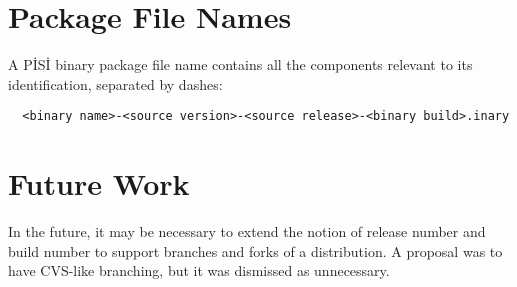 \documentclass[a4paper,11pt]{article}
\begin{document}
\section{Package File Names}

A P\.IS\.I binary package file name contains all the components relevant
to its identification, separated by dashes:
\begin{verbatim}
  <binary name>-<source version>-<source release>-<binary build>.inary
\end{verbatim}

\section{Future Work}

In the future, it may be necessary to extend the notion of release
number and build number to support branches and forks of a
distribution. A proposal was to have CVS-like branching, but it
was dismissed as unnecessary.
\end{document}
